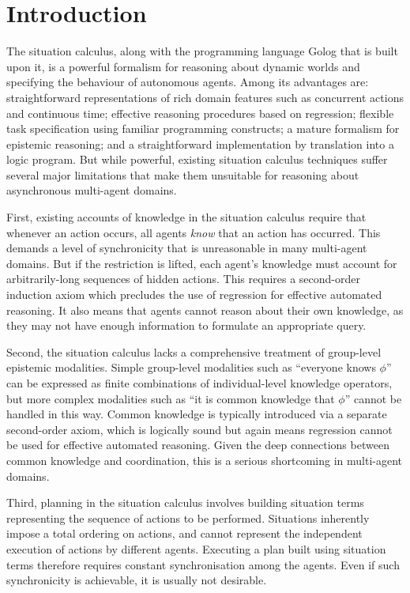 
\chapter{Introduction}

The situation calculus, along with the programming language Golog
that is built upon it, is a powerful formalism for reasoning about
dynamic worlds and specifying the behaviour of autonomous agents.
Among its advantages are: straightforward representations of rich
domain features such as concurrent actions and continuous time; effective
reasoning procedures based on regression; flexible task specification
using familiar programming constructs; a mature formalism for epistemic
reasoning; and a straightforward implementation by translation into
a logic program. But while powerful, existing situation calculus techniques
suffer several major limitations that make them unsuitable for reasoning
about asynchronous multi-agent domains.

First, existing accounts of knowledge in the situation calculus require
that whenever an action occurs, all agents \emph{know} that an action
has occurred. This demands a level of synchronicity that is unreasonable
in many multi-agent domains. But if the restriction is lifted, each
agent's knowledge must account for arbitrarily-long sequences of hidden
actions. This requires a second-order induction axiom which precludes
the use of regression for effective automated reasoning. It also means
that agents cannot reason about their own knowledge, as they may not
have enough information to formulate an appropriate query.

Second, the situation calculus lacks a comprehensive treatment of
group-level epistemic modalities. Simple group-level modalities such
as {}``everyone knows $\phi$'' can be expressed as finite combinations
of individual-level knowledge operators, but more complex modalities
such as {}``it is common knowledge that $\phi$'' cannot be handled
in this way. Common knowledge is typically introduced via a separate
second-order axiom, which is logically sound but again means regression
cannot be used for effective automated reasoning. Given the deep connections
between common knowledge and coordination, this is a serious shortcoming
in multi-agent domains.

Third, planning in the situation calculus involves building situation
terms representing the sequence of actions to be performed. Situations
inherently impose a total ordering on actions, and cannot represent
the independent execution of actions by different agents. Executing
a plan built using situation terms therefore requires constant synchronisation
among the agents. Even if such synchronicity is achievable, it is
usually not desirable.\\


